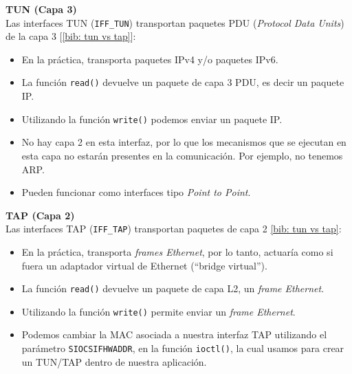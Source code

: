 \documentclass[12pt]{article}
\begin{document}
	\vspace{5px}

	\noindent \textbf{\large TUN (Capa 3)}\\
	\noindent Las interfaces TUN (\texttt{IFF\_TUN}) transportan paquetes PDU (\textit{Protocol Data Units}) de la capa 3 [\ref{bib: tun vs tap}]:
	\begin{itemize}
		\item En la práctica, transporta paquetes IPv4 y/o paquetes IPv6.
		\item La función \texttt{read()} devuelve un paquete de capa 3 PDU, es decir un paquete IP.
		\item Utilizando la función \texttt{write()} podemos enviar un paquete IP.
		\item No hay capa 2 en esta interfaz, por lo que los mecanismos que se ejecutan en esta capa no estarán presentes en la comunicación. Por ejemplo, no tenemos ARP.
		\item Pueden funcionar como interfaces tipo \textit{Point to Point}.
	\end{itemize}
	
	\pagebreak
	
	\noindent \textbf{\large TAP (Capa 2)}\\
	\noindent Las interfaces TAP (\texttt{IFF\_TAP}) transportan paquetes de capa 2 \ref{bib: tun vs tap}: 
	\begin{itemize}
		\item En la práctica, transporta \textit{frames Ethernet}, por lo tanto, actuaría como si fuera un adaptador virtual de Ethernet (``bridge virtual'').
		\item La función \texttt{read()} devuelve un paquete de capa L2, un \textit{frame Ethernet}.
		\item Utilizando la función \texttt{write()} permite enviar un \textit{frame Ethernet}.
		\item Podemos cambiar la MAC asociada a nuestra interfaz TAP utilizando el parámetro \texttt{SIOCSIFHWADDR}, en la función \texttt{ioctl()}, la cual usamos para crear un TUN/TAP dentro de nuestra aplicación.
	\end{itemize}

	\vspace{5px}
\end{document}
